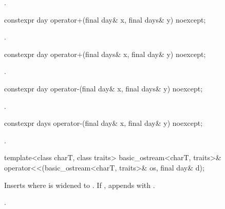 \begin{itemdescr}
\pnum
\returns {}.
\end{itemdescr}

%
\begin{itemdecl}
constexpr day operator+(final day& x, final days& y) noexcept;
\end{itemdecl}

\begin{itemdescr}
\pnum
\returns {}.
\end{itemdescr}

%
\begin{itemdecl}
constexpr day operator+(final days& x, final day& y) noexcept;
\end{itemdecl}

\begin{itemdescr}
\pnum
\returns {}.
\end{itemdescr}

%
\begin{itemdecl}
constexpr day operator-(final day& x, final days& y) noexcept;
\end{itemdecl}

\begin{itemdescr}
\pnum
\returns {}.
\end{itemdescr}

%
\begin{itemdecl}
constexpr days operator-(final day& x, final day& y) noexcept;
\end{itemdecl}

\begin{itemdescr}
\pnum
\returns {}.
\end{itemdescr}

%
\begin{itemdecl}
template<class charT, class traits>
  basic_ostream<charT, traits>&
    operator<<(basic_ostream<charT, traits>& os, final day& d);
\end{itemdecl}

\begin{itemdescr}
\pnum
\effects
Inserts 
where  is  widened to .
If , appends with .

\pnum
\returns {}.
\end{itemdescr}

